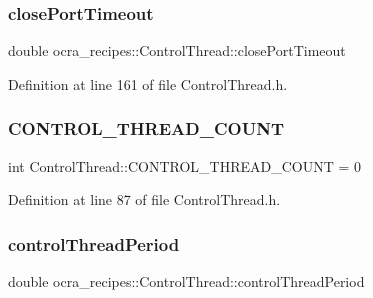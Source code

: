 \subsubsection{\texorpdfstring{close\+Port\+Timeout}{closePortTimeout}}
{\footnotesize\ttfamily double ocra\+\_\+recipes\+::\+Control\+Thread\+::close\+Port\+Timeout\hspace{0.3cm}{\ttfamily [protected]}}



Definition at line 161 of file Control\+Thread.\+h.

\hypertarget{classocra__recipes_1_1ControlThread_af77b19fbb04fcf73374045928d3fef12}{}\label{classocra__recipes_1_1ControlThread_af77b19fbb04fcf73374045928d3fef12} 
\subsubsection{\texorpdfstring{C\+O\+N\+T\+R\+O\+L\+\_\+\+T\+H\+R\+E\+A\+D\+\_\+\+C\+O\+U\+NT}{CONTROL\_THREAD\_COUNT}}
{\footnotesize\ttfamily int Control\+Thread\+::\+C\+O\+N\+T\+R\+O\+L\+\_\+\+T\+H\+R\+E\+A\+D\+\_\+\+C\+O\+U\+NT = 0\hspace{0.3cm}{\ttfamily [static]}}



Definition at line 87 of file Control\+Thread.\+h.

\hypertarget{classocra__recipes_1_1ControlThread_affbc4af946e3c2eabd2ce1cf30376bf2}{}\label{classocra__recipes_1_1ControlThread_affbc4af946e3c2eabd2ce1cf30376bf2} 
\subsubsection{\texorpdfstring{control\+Thread\+Period}{controlThreadPeriod}}
{\footnotesize\ttfamily double ocra\+\_\+recipes\+::\+Control\+Thread\+::control\+Thread\+Period\hspace{0.3cm}{\ttfamily [protected]}}




